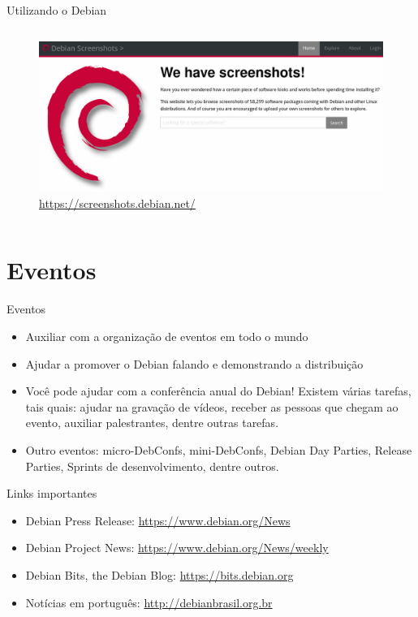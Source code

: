 \documentclass[10pt, compress, aspectratio=169]{beamer}
\begin{document}
\begin{frame}{Utilizando o Debian}
\begin{columns}[T]
\begin{column}{.5\textwidth}
      \begin{figure}
        \centering
        \includegraphics[width=\linewidth,
                         height=0.4\textheight,
                         keepaspectratio]{screenshots_debian}
        \caption{\url{https://screenshots.debian.net/}}
      \end{figure}
   \end{column}
  \end{columns}
\end{frame}

\section{Eventos}

\begin{frame}{Eventos}
  \begin{itemize}
    \item Auxiliar com a organização de eventos em todo o mundo
    \item Ajudar a promover o Debian falando e demonstrando a distribuição
    \item Você pode ajudar com a conferência anual do Debian! Existem várias
          tarefas, tais quais: ajudar na gravação de vídeos, receber as pessoas
          que chegam ao evento, auxiliar palestrantes, dentre outras tarefas.
    \item Outro eventos: micro-DebConfs, mini-DebConfs, Debian Day Parties,
          Release Parties, Sprints de desenvolvimento, dentre outros.
  \end{itemize}

  \begin{exampleblock}{Links importantes}
    \begin{itemize}
      \item Debian Press Release: \url{https://www.debian.org/News}
      \item Debian Project News: \url{https://www.debian.org/News/weekly}
      \item Debian Bits, the Debian Blog: \url{https://bits.debian.org}
      \item Notícias em português: \url{http://debianbrasil.org.br}
    \end{itemize}
  \end{exampleblock}

\end{frame}
\end{document}
